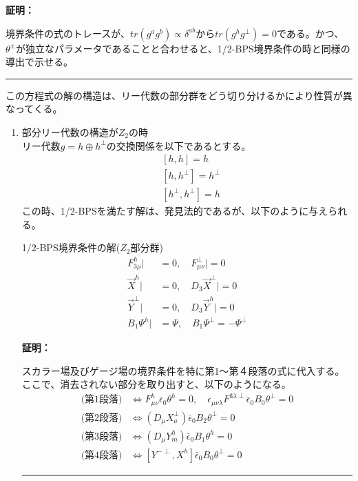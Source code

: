 \documentclass[dvipdfmx,a4paper,10.5pt]{article}
\numberwithin{equation}{section}
\newenvironment{proofbox}
{\begin{prooflabel}\textbf{証明：}\end{prooflabel}\vspace{0.8em}}
{\par\vspace{1em}\hrule\vspace{1em}}
\begin{document}
\begin{proofbox}
    境界条件の式のトレースが、$tr(g^{a}g^{b})\propto\delta^{ab}$から$tr(g^{h}g^{\perp})=0$である。かつ、$\theta^{\pm}$が独立なパラメータであることと合わせると、1/2-BPS境界条件の時と同様の導出で示せる。
\end{proofbox}
この方程式の解の構造は、リー代数の部分群をどう切り分けるかにより性質が異なってくる。
\begin{enumerate}
    \item 部分リー代数の構造が$Z_{2}$の時\\
    リー代数$g=h\oplus h^{\perp}$の交換関係を以下であるとする。
    \begin{align*}
        &[h,h]=h\\
        &[h,h^{\perp}]=h^{\perp}\\
        &[h^{\perp},h^{\perp}]=h
    \end{align*}
    この時、1/2-BPSを満たす解は、発見法的であるが、以下のように与えられる。
    \begin{resultbox}{1/2-BPS境界条件の解($Z_{2}$部分群)}
        \begin{equation}
\begin{split}
     F_{3\mu}^{h}|&=0,\quad
    F_{\mu\nu}^{\perp}|=0\\
    \vec{X}^{h}|&=0,\quad
    D_{3}\vec{X}^{\perp}|=0\\
    \vec{Y}^{\perp}|&=0,\quad
    D_{3}\vec{Y}^{h}|=0\\
    B_{1}\Psi^{h}|&=\Psi,\quad B_{1}\Psi^{\perp}=-\Psi^{\perp}
\end{split}
\end{equation}
    \end{resultbox}
    \begin{proofbox}
        スカラー場及びゲージ場の境界条件を特に第1～第４段落の式に代入する。ここで、消去されない部分を取り出すと、以下のようになる。
\begin{equation}\begin{split}
    \text{(第1段落)}&\iff F_{\mu\nu}^{h}\bar{\epsilon}_{0}\theta^{h}=0,\quad
    \epsilon_{\mu\nu\lambda}F^{3\lambda\perp}\bar{\epsilon}_{0}B_{0}\theta^{\perp}=0\\
    \text{(第2段落)}&\iff (D_{\mu}X_{a}^{\perp})\bar{\epsilon}_{0}B_{2}\theta^{\perp}=0\\
    \text{(第3段落)}&\iff (D_{\mu}Y_{m}^{h})\bar{\epsilon}_{0}B_{1}\theta^{h}=0\\
    \text{(第4段落)}&\iff [Y^{-\perp},X^{h}]\bar{\epsilon}_{0}B_{0}\theta^{\perp}=0
\end{split} \end{equation}

\end{proofbox}
\end{enumerate}
\end{document}
